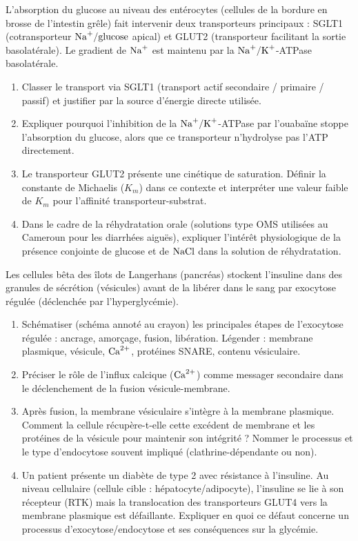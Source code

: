 \documentclass[11pt]{article}
\begin{document}
\begin{exercice}
L'absorption du glucose au niveau des entérocytes (cellules de la bordure en brosse de l'intestin grêle) fait intervenir deux transporteurs principaux : SGLT1 (cotransporteur $\ce{Na+}/\ce{glucose}$ apical) et GLUT2 (transporteur facilitant la sortie basolatérale). Le gradient de $\ce{Na+}$ est maintenu par la $\ce{Na+/K+}$-ATPase basolatérale.
\begin{enumerate}
    \item Classer le transport via SGLT1 (transport actif secondaire / primaire / passif) et justifier par la source d'énergie directe utilisée.
    \item Expliquer pourquoi l'inhibition de la $\ce{Na+/K+}$-ATPase par l'ouabaïne stoppe l'absorption du glucose, alors que ce transporteur n'hydrolyse pas l'ATP directement.
    \item Le transporteur GLUT2 présente une cinétique de saturation. Définir la constante de Michaelis ($K_m$) dans ce contexte et interpréter une valeur faible de $K_m$ pour l'affinité transporteur-substrat.
    \item Dans le cadre de la réhydratation orale (solutions type OMS utilisées au Cameroun pour les diarrhées aiguës), expliquer l'intérêt physiologique de la présence conjointe de glucose et de $\ce{NaCl}$ dans la solution de réhydratation.
\end{enumerate}
\end{exercice}

\begin{exercice}
Les cellules bêta des îlots de Langerhans (pancréas) stockent l'insuline dans des granules de sécrétion (vésicules) avant de la libérer dans le sang par exocytose régulée (déclenchée par l'hyperglycémie).
\begin{enumerate}
    \item Schématiser (schéma annoté au crayon) les principales étapes de l'exocytose régulée : ancrage, amorçage, fusion, libération. Légender : membrane plasmique, vésicule, $\ce{Ca^{2+}}$, protéines SNARE, contenu vésiculaire.
    \item Préciser le rôle de l'influx calcique ($\ce{Ca^{2+}}$) comme messager secondaire dans le déclenchement de la fusion vésicule-membrane.
    \item Après fusion, la membrane vésiculaire s'intègre à la membrane plasmique. Comment la cellule récupère-t-elle cette excédent de membrane et les protéines de la vésicule pour maintenir son intégrité ? Nommer le processus et le type d'endocytose souvent impliqué (clathrine-dépendante ou non).
    \item Un patient présente un diabète de type 2 avec résistance à l'insuline. Au niveau cellulaire (cellule cible : hépatocyte/adipocyte), l'insuline se lie à son récepteur (RTK) mais la translocation des transporteurs GLUT4 vers la membrane plasmique est défaillante. Expliquer en quoi ce défaut concerne un processus d'exocytose/endocytose et ses conséquences sur la glycémie.
\end{enumerate}
\end{exercice}
\end{document}
